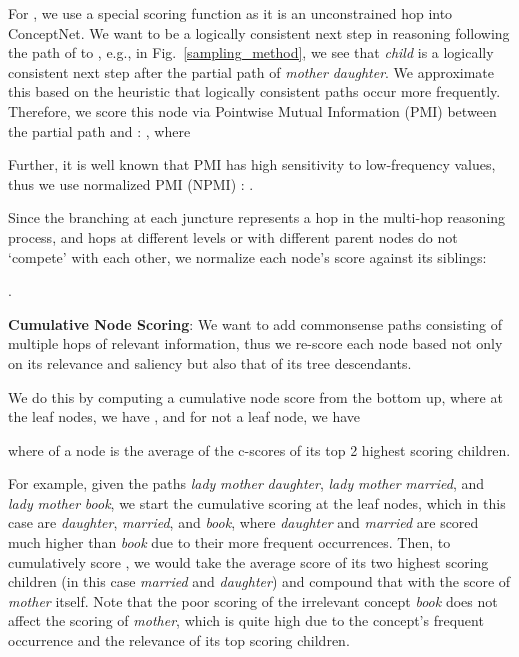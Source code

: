 \documentclass[11pt,a4paper]{article}
\def\figref#1{Fig.~\ref{#1}}
\begin{document}
For , we use a special scoring function as it is an unconstrained hop into ConceptNet.
We want  to be a logically consistent next step in reasoning following the path of  to , e.g., in \figref{sampling_method}, we see that {\it child} is a logically consistent next step after the partial path of {\it mother}  {\it daughter}. We approximate this based on the heuristic that logically consistent paths occur more frequently.
Therefore, we score this node via Pointwise Mutual Information (PMI) between the partial path  and : , where
\vspace{-2pt}


Further, it is well known that PMI has high sensitivity to low-frequency values, thus we use normalized PMI (NPMI) \cite{bouma2009normalized}:
.

Since the branching at each juncture represents a hop in the multi-hop reasoning process, and hops at different levels or with different parent nodes do not `compete' with each other, we normalize each node's score against its siblings:

\vspace{5pt}
.
\vspace{5pt}

\noindent\textbf{Cumulative Node Scoring}:
We want to add commonsense paths consisting of multiple hops of relevant information, thus we re-score each node based not only on its relevance and saliency but also that of its tree descendants. 

We do this by computing a cumulative node score from the bottom up, where at the leaf nodes, we have , and for  not a leaf node, we have

where  of a node is the average of the c-scores of its top 2 highest scoring children.

For example, given the paths {\it lady}  {\it mother}  {\it daughter}, {\it lady}  {\it mother}  {\it married}, and {\it lady}  {\it mother}  {\it book}, we start the cumulative scoring at the leaf nodes, which in this case are {\it daughter}, {\it married}, and {\it book}, where  {\it daughter} and {\it married} are scored much higher than {\it book} due to their more frequent occurrences. Then, to cumulatively score , we would take the average score of its two highest scoring children (in this case {\it married} and {\it daughter})  and compound that with the score of {\it mother} itself. Note that the poor scoring of the irrelevant concept {\it book} does not affect the scoring of {\it mother}, which is quite high due to the concept's frequent occurrence and the relevance of its top scoring children.
\end{document}
